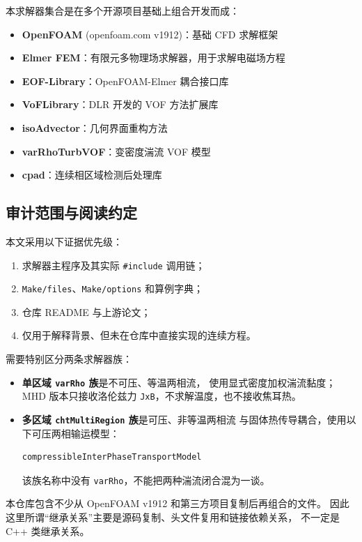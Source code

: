 \documentclass[11pt,a4paper]{article}
\begin{document}
本求解器集合是在多个开源项目基础上组合开发而成：

\begin{itemize}
    \item \textbf{OpenFOAM} (openfoam.com v1912)：基础 CFD 求解框架
    \item \textbf{Elmer FEM}：有限元多物理场求解器，用于求解电磁场方程
    \item \textbf{EOF-Library}：OpenFOAM-Elmer 耦合接口库\cite{Vencels2019}
    \item \textbf{VoFLibrary}：DLR 开发的 VOF 方法扩展库
    \item \textbf{isoAdvector}：几何界面重构方法\cite{Roenby2016}
    \item \textbf{varRhoTurbVOF}：变密度湍流 VOF 模型\cite{Fan2019}
    \item \textbf{cpad}：连续相区域检测后处理库
\end{itemize}

\subsection{审计范围与阅读约定}

本文采用以下证据优先级：
\begin{enumerate}[label=\arabic*.]
    \item 求解器主程序及其实际 \texttt{\#include} 调用链；
    \item \texttt{Make/files}、\texttt{Make/options} 和算例字典；
    \item 仓库 README 与上游论文；
    \item 仅用于解释背景、但未在仓库中直接实现的连续方程。
\end{enumerate}

需要特别区分两条求解器族：
\begin{itemize}
    \item \textbf{单区域 \texttt{varRho} 族}是不可压、等温两相流，
    使用显式密度加权湍流黏度；MHD 版本只接收洛伦兹力
    \texttt{JxB}，不求解温度，也不接收焦耳热。
    \item \textbf{多区域 \texttt{chtMultiRegion} 族}是可压、非等温两相流
    与固体热传导耦合，使用以下可压两相输运模型：
\begin{lstlisting}[style=cppstyle,numbers=none]
compressibleInterPhaseTransportModel
\end{lstlisting}
    该族名称中没有 \texttt{varRho}，不能把两种湍流闭合混为一谈。
\end{itemize}

本仓库包含不少从 OpenFOAM v1912 和第三方项目复制后再组合的文件。
因此这里所谓“继承关系”主要是源码复制、头文件复用和链接依赖关系，
不一定是 C++ 类继承关系。
\end{document}
